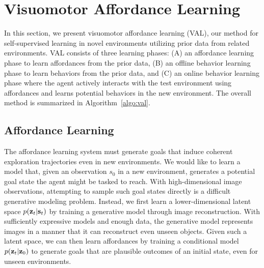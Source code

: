 \documentclass[letterpaper, 10 pt, conference]{ieeeconf}  %
\begin{document}
\section{Visuomotor Affordance Learning}
\label{sec:method}

In this section, we present visuomotor affordance learning (VAL), our method for self-supervised learning in novel environments utilizing prior data from related environments. VAL consists of three learning phases: (A) an affordance learning phase to learn affordances from the prior data, (B) an offline behavior learning phase to learn behaviors from the prior data, and (C) an online behavior learning phase where the agent actively interacts with the test environment using affordances and learns potential behaviors in the new environment.
The overall method is summarized in Algorithm~\ref{algo:val}.



\subsection{Affordance Learning}
\label{sec:method_affordance_learning}

The affordance learning system must generate goals that induce coherent exploration trajectories even in new environments.
We would like to learn a model that, given an observation $s_0$ in a new environment, generates a potential goal state the agent might be tasked to reach.
With high-dimensional image observations, attempting to sample such goal states directly is a difficult generative modeling problem.
Instead, we first learn a lower-dimensional latent space $p(\mathbf{z}_t|\mathbf{s}_t)$ by training a generative model through image reconstruction.
With sufficiently expressive models and enough data, the generative model represents images in a manner that it can reconstruct even unseen objects.
Given such a latent space, we can then learn affordances by training a conditional model $p(\mathbf{z}_t|\mathbf{z}_0)$
to generate goals that are plausible outcomes of an initial state, even for unseen environments.
\end{document}
